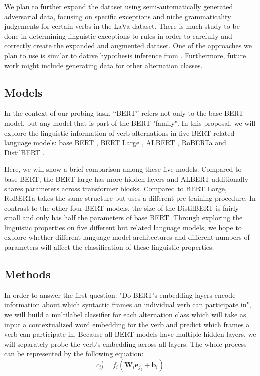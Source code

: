 \documentclass[11pt]{article}
\begin{document}
We plan to further expand the dataset using semi-automatically generated adversarial data, focusing on specific exceptions and niche grammaticality judgements for certain verbs in the LaVa dataset. There is much study to be done in determining linguistic exceptions to rules in order to carefully and correctly create the expanded and augmented dataset. One of the approaches we plan to use is similar to dative hypothesis inference from \citet{diversifying2019}. Furthermore, future work might include generating data for other alternation classes.


\subsection{Models}
In the context of our probing task, ``BERT'' refers not only to the base BERT model, but any model that is part of the BERT "family". In this proposal, we will explore the linguistic information of verb alternations in five BERT related language models: base BERT \cite{bertpaper}, BERT Large \cite{bertpaper}, ALBERT \cite{lan2019albert}, RoBERTa \cite{liu2019roberta} and DistilBERT \cite{sanh2019distilbert}.

Here, we will show a brief comparison among these five models. Compared to base BERT, the BERT large has more hidden layers and ALBERT additionally shares parameters across transformer blocks. Compared to BERT Large, RoBERTa takes the same structure but uses a different pre-training procedure. In contrast to the other four BERT models, the size of the DistilBERT is fairly small and only has half the parameters of base BERT. Through exploring the linguistic properties on five different but related language models, we hope to explore whether different language model architectures and different numbers of parameters will affect the classification of these linguistic properties.

\subsection{Methods}
In order to answer the first question: "Do BERT’s embedding layers encode information about which syntactic frames an individual verb can participate in", we will build a multilabel classifier for each alternation class which will take as input a contextualized word embedding for the verb and predict which frames a verb can participate in. Because all BERT models have multiple hidden layers, we will separately probe the verb's embedding across all layers. The whole process can be represented by the following equation:
$$\vec{c_{ij}} = f_{i}(\textbf{W}_i\textbf{e}_{j_k} +\textbf{b}_i)$$
\end{document}

